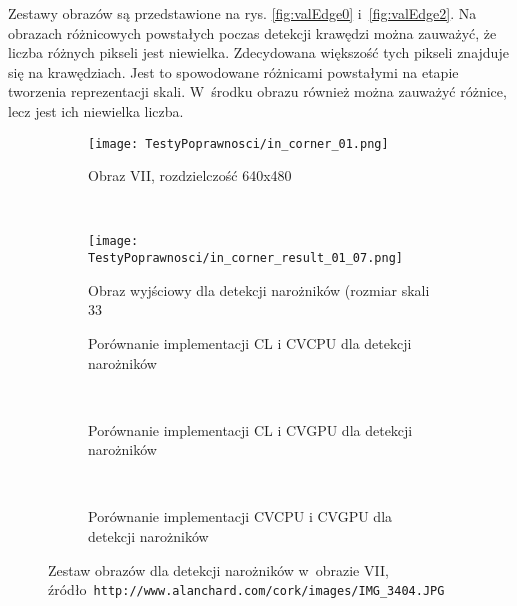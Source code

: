Zestawy obrazów są przedstawione na rys. \ref{fig:valEdge0} i~\ref{fig:valEdge2}. Na obrazach różnicowych powstałych poczas detekcji krawędzi można zauważyć, że liczba różnych pikseli jest niewielka. Zdecydowana większość tych pikseli znajduje się na krawędziach. Jest to spowodowane różnicami powstałymi na etapie tworzenia reprezentacji skali. W~środku obrazu również można zauważyć różnice, lecz jest ich niewielka liczba.

\begin{figure}[H]

\begin{center}
\begin{subfigure}[t]{0.3\textwidth}
\texttt{[image: TestyPoprawnosci/in\_corner\_01.png]}
\caption{Obraz VII, rozdzielczość 640x480}
\label{fig:valCorner01}
\end{subfigure}
~
\begin{subfigure}[t]{0.3\textwidth}
\texttt{[image: TestyPoprawnosci/in\_corner\_result\_01\_07.png]}
\caption{Obraz wyjściowy dla detekcji narożników (rozmiar skali 33}
\label{fig:valCornerResult01}
\end{subfigure}
\end{center}

\begin{subfigure}[t]{0.3\textwidth}
	\centering
	\setlength\fboxsep{0pt}
	\setlength\fboxrule{0.5pt}
	\caption{Porównanie implementacji CL i CVCPU dla detekcji narożników}
	\label{fig:valCorner1CLCVCPU}
\end{subfigure}
~
\begin{subfigure}[t]{0.3\textwidth}
	\centering
	\setlength\fboxsep{0pt}
	\setlength\fboxrule{0.5pt}
	\caption{Porównanie implementacji CL i CVGPU dla detekcji narożników}
	\label{fig:valCorner1CLCVGPU}
\end{subfigure}
~
\begin{subfigure}[t]{0.3\textwidth}
	\centering
	\setlength\fboxsep{0pt}
	\setlength\fboxrule{0.5pt}
	\caption{Porównanie implementacji CVCPU i CVGPU dla detekcji narożników}
	\label{fig:valCorner1CVCPUCVGPU}                 
\end{subfigure}
\caption{Zestaw obrazów dla detekcji narożników w~obrazie VII, \tiny{źródło~\texttt{http://www.alanchard.com/cork/images/IMG\_3404.JPG}}}

\label{fig:valCorner1}
\end{figure}


